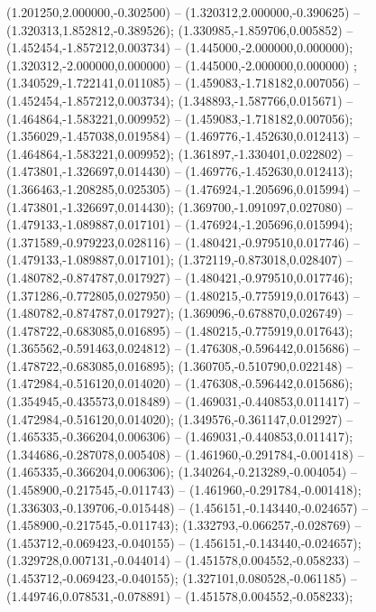  (1.201250,2.000000,-0.302500) -- (1.320312,2.000000,-0.390625) -- (1.320313,1.852812,-0.389526);
 (1.330985,-1.859706,0.005852) -- (1.452454,-1.857212,0.003734) -- (1.445000,-2.000000,0.000000);
 (1.320312,-2.000000,0.000000) -- (1.445000,-2.000000,0.000000) ;
 (1.340529,-1.722141,0.011085) -- (1.459083,-1.718182,0.007056) -- (1.452454,-1.857212,0.003734);
 (1.348893,-1.587766,0.015671) -- (1.464864,-1.583221,0.009952) -- (1.459083,-1.718182,0.007056);
 (1.356029,-1.457038,0.019584) -- (1.469776,-1.452630,0.012413) -- (1.464864,-1.583221,0.009952);
 (1.361897,-1.330401,0.022802) -- (1.473801,-1.326697,0.014430) -- (1.469776,-1.452630,0.012413);
 (1.366463,-1.208285,0.025305) -- (1.476924,-1.205696,0.015994) -- (1.473801,-1.326697,0.014430);
 (1.369700,-1.091097,0.027080) -- (1.479133,-1.089887,0.017101) -- (1.476924,-1.205696,0.015994);
 (1.371589,-0.979223,0.028116) -- (1.480421,-0.979510,0.017746) -- (1.479133,-1.089887,0.017101);
 (1.372119,-0.873018,0.028407) -- (1.480782,-0.874787,0.017927) -- (1.480421,-0.979510,0.017746);
 (1.371286,-0.772805,0.027950) -- (1.480215,-0.775919,0.017643) -- (1.480782,-0.874787,0.017927);
 (1.369096,-0.678870,0.026749) -- (1.478722,-0.683085,0.016895) -- (1.480215,-0.775919,0.017643);
 (1.365562,-0.591463,0.024812) -- (1.476308,-0.596442,0.015686) -- (1.478722,-0.683085,0.016895);
 (1.360705,-0.510790,0.022148) -- (1.472984,-0.516120,0.014020) -- (1.476308,-0.596442,0.015686);
 (1.354945,-0.435573,0.018489) -- (1.469031,-0.440853,0.011417) -- (1.472984,-0.516120,0.014020);
 (1.349576,-0.361147,0.012927) -- (1.465335,-0.366204,0.006306) -- (1.469031,-0.440853,0.011417);
 (1.344686,-0.287078,0.005408) -- (1.461960,-0.291784,-0.001418) -- (1.465335,-0.366204,0.006306);
 (1.340264,-0.213289,-0.004054) -- (1.458900,-0.217545,-0.011743) -- (1.461960,-0.291784,-0.001418);
 (1.336303,-0.139706,-0.015448) -- (1.456151,-0.143440,-0.024657) -- (1.458900,-0.217545,-0.011743);
 (1.332793,-0.066257,-0.028769) -- (1.453712,-0.069423,-0.040155) -- (1.456151,-0.143440,-0.024657);
 (1.329728,0.007131,-0.044014) -- (1.451578,0.004552,-0.058233) -- (1.453712,-0.069423,-0.040155);
 (1.327101,0.080528,-0.061185) -- (1.449746,0.078531,-0.078891) -- (1.451578,0.004552,-0.058233);
